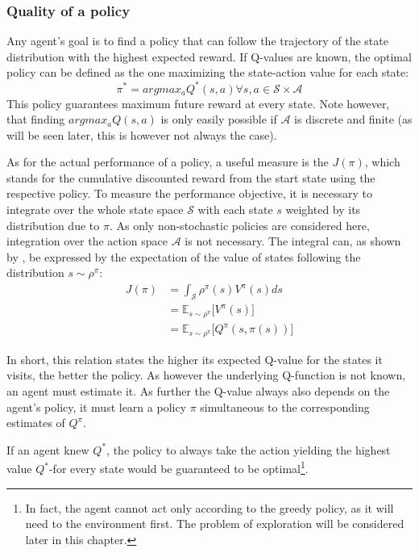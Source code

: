 \subsubsection{Quality of a policy}

Any agent's goal is to find a policy that can follow the trajectory of the state distribution with the highest expected reward. If Q-values are known, the optimal policy can be defined as the one maximizing the state-action value for each state:
\begin{equation}
	\pi^* = argmax_aQ^*(s,a) \forall s,a \in \mathcal{S} \times \mathcal{A}
\end{equation}
This policy guarantees maximum future reward at every state. Note however, that finding $argmax_aQ(s,a)$ is only easily possible if $\mathcal{A}$ is discrete and finite (as will be seen later, this is however not always the case).

As for the actual performance of a policy, a useful measure is the  $J(\pi)$, which stands for the cumulative discounted reward from the start state using the respective policy. To measure the performance objective, it is necessary to integrate over the whole state space $\mathcal{S}$ with each state $s$ weighted by its distribution due to $\pi$. As only non-stochastic policies are considered here, integration over the action space $\mathcal{A}$ is not necessary. The integral can, as shown by \cite{silver_deterministic_2014}, be expressed by the expectation of the value of states following the distribution $s\sim\rho^\pi$:
\begin{align}
	J(\pi) &= \int_\mathcal{S} \rho^\pi(s) V^\pi(s) ds \nonumber\\
	       &= \mathds{E}_{s\sim\rho^\pi} \big[V^\pi(s)] \nonumber\\
	       &= \mathds{E}_{s\sim\rho^\pi} \big[Q^\pi(s, \pi(s))] \label{eq:performance01}
\end{align}

In short, this relation states the higher its expected Q-value for the states it visits, the better the policy. As however the underlying Q-function is not known, an agent must estimate it. As further the Q-value always also depends on the agent's policy, it must learn a policy $\pi$ simultaneous to the corresponding estimates of $Q^\pi$. 

If an agent knew $Q^*$, the  policy to always take the action yielding the highest value $Q^*$-for every state would be guaranteed to be optimal\footnote{\label{footnote:explore} In fact, the agent cannot act only according to the greedy policy, as it will need to  the environment first. The problem of exploration will be considered later in this chapter.}.

